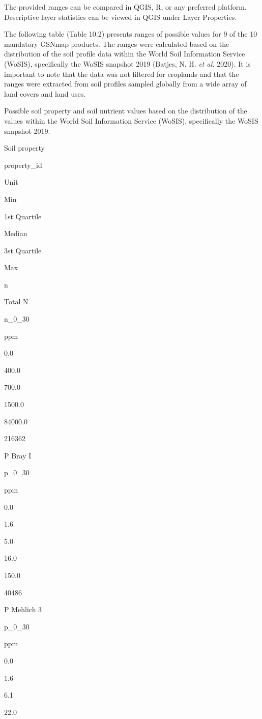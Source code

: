 \documentclass[
  10pt,
  b5paper,
  oneside]{book}
\begin{document}
The provided ranges can be compared in QGIS, R, or any preferred platform. Descriptive layer statistics can be viewed in QGIS under Layer Properties.

The following table (Table 10.2) presents ranges of possible values for 9 of the 10 mandatory GSNmap products. The ranges were calculated based on the distribution of the soil profile data within the World Soil Information Service (WoSIS), specifically the WoSIS snapshot 2019 (Batjes, N. H. \emph{et al.} 2020). It is important to note that the data was not filtered for croplands and that the ranges were extracted from soil profiles sampled globally from a wide array of land covers and land uses.

\label{tab:ranges}\label{tab:ranges}Possible soil property and soil nutrient values based on the distribution of the values within the World Soil Information Service (WoSIS), specifically the WoSIS snapshot 2019.

Soil property

property\_id

Unit

Min

1st Quartile

Median

3st Quartile

Max

n

Total N

n\_0\_30

ppm

0.0

400.0

700.0

1500.0

84000.0

216362

P Bray I

p\_0\_30

ppm

0.0

1.6

5.0

16.0

150.0

40486

P Mehlich 3

p\_0\_30

ppm

0.0

1.6

6.1

22.0
\end{document}
